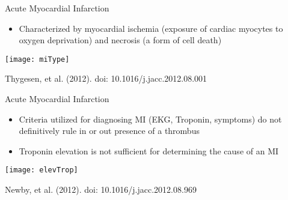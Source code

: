 \documentclass[xcolor=dvipsnames]{beamer}
\begin{document}
\begin{frame}{Acute Myocardial Infarction}
	\vspace{-5pt}
	\begin{itemize}
		\item Characterized by myocardial ischemia (exposure of cardiac myocytes to oxygen deprivation) and necrosis (a form of cell death)
	\end{itemize}
	\begin{center}
		\texttt{[image: miType]}
		
		Thygesen, et al. (2012). doi: 10.1016/j.jacc.2012.08.001
	\end{center}
\end{frame}

\begin{frame}{Acute Myocardial Infarction}
		\vspace{-5pt}
		\begin{itemize}
			\item Criteria utilized for diagnosing MI (EKG, Troponin, symptoms) do not definitively rule in or out presence of a thrombus \pause
			\item Troponin elevation is not sufficient for determining the cause of an MI \pause
		\end{itemize}
		\begin{center}
			\texttt{[image: elevTrop]}
			
			Newby, et al. (2012). doi: 10.1016/j.jacc.2012.08.969
		\end{center}
\end{frame}
\end{document}

